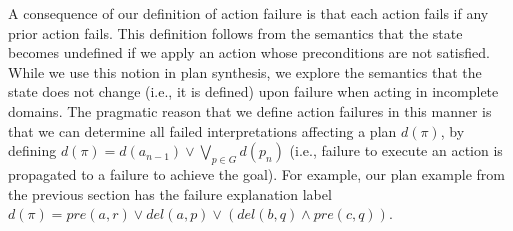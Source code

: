\documentclass[letterpaper]{article}
\begin{document}
A consequence of our definition of action failure is that each action fails if
any prior action fails.  This definition follows from the semantics that the
state becomes undefined if we apply an action whose preconditions are not
satisfied.  While we use this notion in plan synthesis, we explore the semantics
that the state does not change (i.e., it is defined) upon failure when acting in
incomplete domains.  The pragmatic reason that we define action failures in this
manner is that we can determine all failed interpretations affecting a plan $d(\pi)$,
by defining $d(\pi) = d({a}_{n-1}) \vee \bigvee_{p \in G} d(p_n)$ (i.e.,
failure to execute an action is propagated to a
failure to achieve the goal). For example, our plan example from the previous
section has the failure explanation label $d(\pi) = 
pre(a, r) \vee  del(a, p) \vee (del(b, q) \wedge pre(c, q))$.
\end{document}
